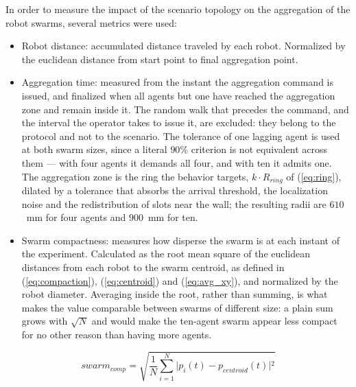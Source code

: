 \documentclass[conference]{IEEEtran}
\begin{document}
In order to measure the impact of the scenario topology on the aggregation of the robot swarms, several metrics were used: 
\begin{itemize}

    \item Robot distance: accumulated distance traveled by each robot. Normalized by the euclidean distance from start point to final aggregation point.
    
    \item Aggregation time: measured from the instant the aggregation command is
    issued, and finalized when all agents but one have reached the aggregation
    zone and remain inside it. The random walk that precedes the command, and the
    interval the operator takes to issue it, are excluded: they belong to the
    protocol and not to the scenario. The tolerance of one lagging agent is used
    at both swarm sizes, since a literal $90\%$ criterion is not equivalent
    across them --- with four agents it demands all four, and with ten it admits
    one. The aggregation zone is the ring the behavior targets, $k \cdot
    R_{ring}$ of (\ref{eq:ring}), dilated by a tolerance that absorbs the arrival
    threshold, the localization noise and the redistribution of slots near the
    wall; the resulting radii are $610$~mm for four agents and $900$~mm for ten.
    
    \item Swarm compactness: measures how disperse the swarm is at each instant of
    the experiment. Calculated as the root mean square of the euclidean distances
    from each robot to the swarm centroid, as defined in (\ref{eq:compaction}),
    (\ref{eq:centroid}) and (\ref{eq:avg_xy}), and normalized by the robot
    diameter. Averaging inside the root, rather than summing, is what makes the
    value comparable between swarms of different size: a plain sum grows with
    $\sqrt{N}$ and would make the ten-agent swarm appear less compact for no
    other reason than having more agents.

\end{itemize}
 

\begin{equation}
    swarm_{comp} = \sqrt{\frac{1}{N} \sum_{i=1}^N \vert{} p_i(t) - p_{centroid}(t) \vert{}^2}
    \label{eq:compaction}
\end{equation}
\end{document}

